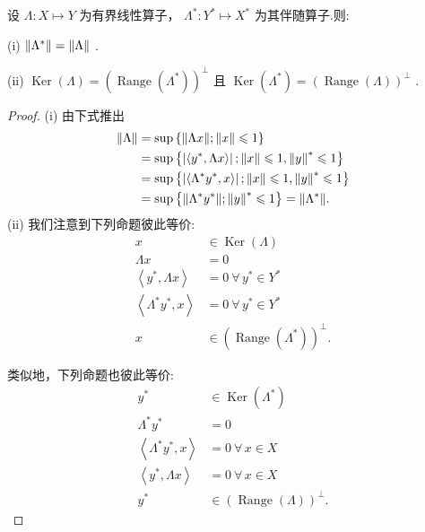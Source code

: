 \begin{theorem}[伴随算子的性质]\label{thm:adjoint-properties}
设 $\Lambda  : X \mapsto  Y$ 为有界线性算子， ${\Lambda }^{ * } : {Y}^{ * } \mapsto  {X}^{ * }$ 为其伴随算子.则:

(i) $\norm{{\Lambda }^{ * }} = \| \Lambda \|$ .

(ii) $\operatorname{Ker}\left( \Lambda \right)  = {\left(  \operatorname{Range}\left( {\Lambda }^{ * }\right) \right)  }^{ \bot  }$ 且 $\operatorname{Ker}\left( {\Lambda }^{ * }\right)  = {\left(  \operatorname{Range}\left( \Lambda \right) \right)  }^{ \bot  }$ .
\end{theorem}

\begin{proof}
(i) 由下式推出
{\setjot[-2]\begin{align*}
    \| \Lambda \| &= \sup \left\{  {\| {\Lambda x}\| ;\| x\|  \leqslant  1}\right\}\\
    &= \sup \left\{  {\left| \left\langle  {{y}^{ * },{\Lambda x}}\right\rangle  \right| ;\| x\|  \leqslant  1,\norm{y}^{ * } \leqslant  1}\right\}\\
    &= \sup \left\{  {\left| \left\langle  {{\Lambda }^{ * }{y}^{ * },x}\right\rangle  \right| ;\| x\|  \leqslant  1,\norm{y}^{ * } \leqslant  1}\right\}\\
    &= \sup \left\{  {\norm{{\Lambda }^{ * }{y}^{ * }};\norm{y}^{ * } \leqslant  1}\right\}   = \norm{{\Lambda }^{ * }}.
\end{align*}}
(ii) 我们注意到下列命题彼此等价:
{\setjot[-4]\begin{align*}
    x &\in  \operatorname{Ker}\left( \Lambda \right)\\
    {\Lambda x} &= 0 \\
    \left\langle  {{y}^{ * },{\Lambda x}}\right\rangle   &= 0\ \forall\,{y}^{ * } \in  {Y}^{ * } \\
    \left\langle  {{\Lambda }^{ * }{y}^{ * },x}\right\rangle   &= 0\ \forall\,{y}^{ * } \in  {Y}^{ * }   \\
    x &\in  {\left(  \operatorname{Range}\left( {\Lambda }^{ * }\right) \right)  }^{ \bot  }.
\end{align*}}

类似地，下列命题也彼此等价:
{\setjot[-4]\begin{align*}
    {y}^{ * } &\in  \operatorname{Ker}\left( {\Lambda }^{ * }\right)\\
    {\Lambda }^{ * }{y}^{ * } &= 0\\
    \left\langle  {{\Lambda }^{ * }{y}^{ * },x}\right\rangle   &= 0\ \forall\,x \in  X\\
    \left\langle  {{y}^{ * },{\Lambda x}}\right\rangle   &= 0\ \forall\,x \in  X\\
    {y}^{ * } &\in  {\left(  \operatorname{Range}\left( \Lambda \right) \right)  }^{ \bot  }.
\end{align*}}

\end{proof}

